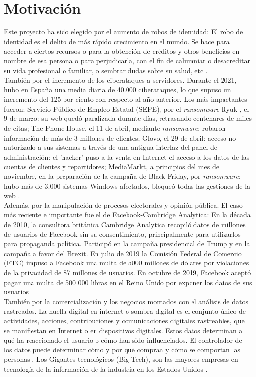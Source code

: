 \section{Motivación}
Este proyecto ha sido elegido por el aumento de robos de identidad: El robo de identidad es el delito de más rápido crecimiento en el mundo. Se hace para acceder a ciertos recursos o para la obtención de créditos y otros beneficios en nombre de esa persona o para perjudicarla, con el fin de calumniar o desacreditar su vida profesional o familiar, o sembrar dudas sobre su salud, etc \cite{web:robo_de_identidad}.\\
También por el incremento de los ciberataques a servidores. Durante el 2021, hubo en España una media diaria de 40.000 ciberataques, lo que supuso un incremento del 125 por ciento con respecto al año anterior. Los más impactantes fueron: Servicio Público de Empleo Estatal (SEPE), por el \textit{ransomware} Ryuk , el 9 de marzo: su web quedó paralizada durante días, retrasando centenares de miles de citas; The Phone House, el 11 de abril, mediante \textit{ransomware}: robaron información de más de 3 millones de clientes; Glovo, el 29 de abril: acceso no autorizado a sus sistemas a través de una antigua interfaz del panel de administración: el 'hacker' puso a la venta en Internet el acceso a los datos de las cuentas de clientes y repartidores; MediaMarkt, a principios del mes de noviembre, en la preparación de la campaña de Black Friday, por \textit{ransomware}: hubo más de 3.000 sistemas Windows afectados, bloqueó todas las gestiones de la web \cite{web:ciberataques }.\\
Además, por la manipulación de procesos electorales y opinión pública. El caso más reciente e importante fue el de Facebook-Cambridge Analytica: En la década de 2010, la consultora británica Cambridge Analytica recopiló datos de millones de usuarios de Facebook sin su consentimiento, principalmente para utilizarlos para propaganda política. Participó en la campaña presidencial de Trump y en la campaña a favor del Brexit. En julio de 2019 la Comisión Federal de Comercio (FTC) impuso a Facebook una multa de 5000 millones de dólares por violaciones de la privacidad de 87 millones de usuarios. En octubre de 2019, Facebook aceptó pagar una multa de 500 000 libras en el Reino Unido por exponer los datos de sus usuarios \cite{web:CA}.\\
También por la comercialización y los negocios montados con el análisis de datos rastreados. La huella digital en internet o sombra digital es el conjunto único de actividades, acciones, contribuciones y comunicaciones digitales rastreables, que se manifiestan en Internet o en dispositivos digitales. Estos datos determinan a qué ha reaccionado el usuario o cómo han sido influenciados. El controlador de los datos puede determinar cómo y por qué compran y cómo se comportan las personas \cite{web:huella}. Los Gigantes tecnológicos (Big Tech), son las mayores empresas en tecnología de la información de la industria en los Estados Unidos \cite{web:gigantes}.\\
